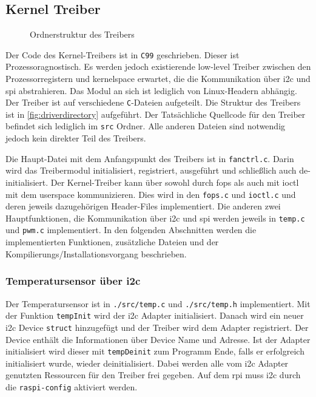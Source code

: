 \subsection{Kernel Treiber}

\begin{wrapfigure}{o}[1cm]{8cm}
\caption{Ordnerstruktur des Treibers}
\label{fig:driverdirectory}
\end{wrapfigure}

Der Code des Kernel-Treibers ist in \texttt{C99} geschrieben.
Dieser ist Prozessoragnostisch.
Es werden jedoch existierende low-level Treiber zwischen den Prozessorregistern und \gls{kernelspace} erwartet, die die Kommunikation über \gls{i2c} und \gls{spi} abstrahieren.
Das Modul an sich ist lediglich von Linux-Headern abhängig.
Der Treiber ist auf verschiedene \texttt{C}-Dateien aufgeteilt.
Die Struktur des Treibers ist in \autoref{fig:driverdirectory} aufgeführt.
Der Tatsächliche Quellcode für den Treiber befindet sich lediglich im \texttt{src} Ordner.
Alle anderen Dateien sind notwendig jedoch kein direkter Teil des Treibers.

Die Haupt-Datei mit dem Anfangspunkt des Treibers ist in \texttt{fanctrl.c}.
Darin wird das Treibermodul initialisiert, registriert, ausgeführt und schließlich auch de-initialisiert.
Der Kernel-Treiber kann über sowohl durch \gls{fops} als auch mit \gls{ioctl} mit dem \gls{userspace} kommunizieren.
Dies wird in den \texttt{fops.c} und \texttt{ioctl.c} und deren jeweils dazugehörigen Header-Files implementiert.
Die anderen zwei Hauptfunktionen, die Kommunikation über \gls{i2c} und \gls{spi} werden jeweils in \texttt{temp.c} und \texttt{pwm.c} implementiert.
In den folgenden Abschnitten werden die implementierten Funktionen, zusätzliche Dateien und der Kompilierungs/Installationsvorgang beschrieben.

\subsubsection{Temperatursensor über \acrshort{i2c}}

Der Temperatursensor ist in \texttt{./src/temp.c} und \texttt{./src/temp.h} implementiert.
Mit der Funktion \texttt{tempInit} wird der \gls{i2c} Adapter initialisiert.
Danach wird ein neuer \gls{i2c} Device \texttt{struct} hinzugefügt und der Treiber wird dem Adapter registriert.
Der Device enthält die Informationen über Device Name und Adresse.
Ist der Adapter initialisiert wird dieser mit \texttt{tempDeinit} zum Programm Ende, falls er erfolgreich initialisiert wurde, wieder deinitialisiert.
Dabei werden alle vom \gls{i2c} Adapter genutzten Ressourcen für den Treiber frei gegeben.
Auf dem \gls{rpi} muss \gls{i2c} durch die \texttt{raspi-config} aktiviert werden.

